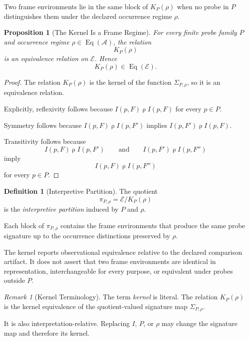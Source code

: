 \documentclass[11pt]{article}
\theoremstyle{plain}
\newtheorem{proposition}[theorem]{Proposition}
\theoremstyle{definition}
\newtheorem{definition}[theorem]{Definition}
\theoremstyle{remark}
\newtheorem{remark}[theorem]{Remark}
\begin{document}
Two frame environments lie in the same block of \(K_P(\rho)\)
when no probe in \(P\) distinguishes them
under the declared occurrence regime \(\rho\).

\begin{proposition}[The Kernel Is a Frame Regime]
  \label{ik.prop.kernel-equivalence}
  For every finite probe family \(P\)
  and occurrence regime
  \(\rho\in\operatorname{Eq}(\mathcal{A})\),
  the relation
  \[
    K_P(\rho)
  \]
  is an equivalence relation on \(\mathcal{E}\).
  Hence
  \[
    K_P(\rho)
    \in
    \operatorname{Eq}(\mathcal{E}).
  \]
\end{proposition}

\begin{proof}
  The relation \(K_P(\rho)\)
  is the kernel of the function \(\Sigma_{P,\rho}\),
  so it is an equivalence relation.

  Explicitly,
  reflexivity follows because
  \(I(p,F)\mathrel{\rho}I(p,F)\)
  for every \(p\in P\).

  Symmetry follows because
  \(I(p,F)\mathrel{\rho}I(p,F')\)
  implies
  \(I(p,F')\mathrel{\rho}I(p,F)\).

  Transitivity follows because
  \[
    I(p,F)\mathrel{\rho}I(p,F')
    \qquad\text{and}\qquad
    I(p,F')\mathrel{\rho}I(p,F'')
  \]
  imply
  \[
    I(p,F)\mathrel{\rho}I(p,F'')
  \]
  for every \(p\in P\).
\end{proof}

\begin{definition}[Interpretive Partition]
  \label{ik.def.interpretive-partition}
  The quotient
  \[
    \pi_{P,\rho}
    =
    \mathcal{E}/K_P(\rho)
  \]
  is the \emph{interpretive partition}
  induced by \(P\) and \(\rho\).
\end{definition}

Each block of \(\pi_{P,\rho}\)
contains the frame environments
that produce the same probe signature
up to the occurrence distinctions preserved by \(\rho\).

The kernel reports observational equivalence
relative to the declared comparison artifact.
It does not assert that two frame environments
are identical in representation,
interchangeable for every purpose,
or equivalent under probes outside \(P\).

\begin{remark}[Kernel Terminology]
  \label{ik.rem.kernel-terminology}
  The term \emph{kernel} is literal.
  The relation \(K_P(\rho)\)
  is the kernel equivalence of the quotient-valued signature map
  \(\Sigma_{P,\rho}\).

  It is also interpretation-relative.
  Replacing \(I\),
  \(P\),
  or \(\rho\)
  may change the signature map
  and therefore its kernel.
\end{remark}
\end{document}
